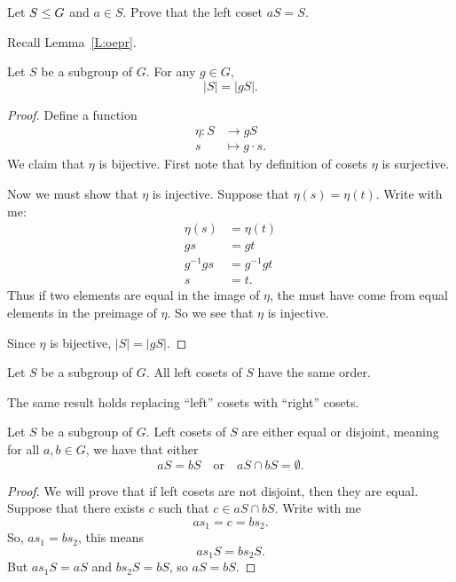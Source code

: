 \documentclass{ximera}
\begin{document}
\begin{exercise}
  Let $S\leq G$ and $a\in S$. Prove that the left coset $aS = S$.
  \begin{hint}
    Recall Lemma~\ref{L:oepr}.
  \end{hint}
\end{exercise}





\begin{lemma}\label{P:CSG}
  Let $S$ be a subgroup of $G$. For any $g\in G$,
  \[
  |S| = |gS|.
  \]
  \begin{proof}
    Define a function
    \begin{align*}
      \eta: S &\to g S\\
      s &\mapsto g\cdot s.
    \end{align*}
    We claim that $\eta$ is bijective. First note that by definition
    of cosets $\eta$ is surjective.

    Now we must show that $\eta$ is injective. Suppose that $\eta(s) =
    \eta(t)$. Write with me:
    \begin{align*}
      \eta(s) &= \eta(t) \\
      gs &= gt\\
      g^{-1} g s &= g^{-1} g t\\
      s &= t.
    \end{align*}
    Thus if two elements are equal in the image of $\eta$, the must
    have come from equal elements in the preimage of $\eta$. So we see
    that $\eta$ is injective.

    Since $\eta$ is bijective, $|S|= |gS|$.
  \end{proof}
\end{lemma}

\begin{corollary}
  Let $S$ be a subgroup of $G$. All left cosets of $S$ have the same
  order.
\end{corollary}

\begin{remark}
  The same result holds replacing ``left'' cosets with ``right''
  cosets.
\end{remark}



\begin{lemma}\label{L:cosetED}
  Let $S$ be a subgroup of $G$. Left cosets of $S$ are either equal or
  disjoint, meaning for all $a,b\in G$, we have that either
  \[
  aS = bS \quad\text{or}\quad aS \cap bS = \emptyset.
  \]
  \begin{proof}
    We will prove that if left cosets are not disjoint, then they are
    equal. Suppose that there exists $c$ such that $c\in aS \cap
    bS$. Write with me
    \[
    as_1 = c = bs_2.
    \]
    So, $as_1 = bs_2$, this means
    \[
    as_1 S = bs_2 S.
    \]
    But $as_1S = aS$ and $bs_2 S = bS$, so $aS = bS$.
  \end{proof}
\end{lemma}
\end{document}
